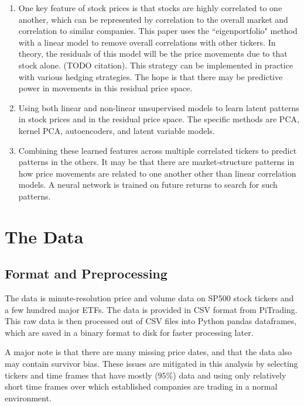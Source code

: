 \documentclass{article}
\begin{document}
\begin{enumerate}
    \item
     One key feature of stock prices is that stocks are highly correlated to one
        another, which can be represented by correlation to the overall market
        and correlation to similar companies. This paper uses the ``eigenportfolio"
        method with a linear model to remove overall correlations with other tickers.
        In theory, the residuals of this model will be the price movements due to that
        stock alone. (TODO citation). This strategy can be implemented in practice
        with various hedging strategies. The hope is that there may be predictive
        power in movements in this residual price space.
    \item
      Using both linear and non-linear unsupervised models to learn latent patterns
        in stock prices and in the residual price space. The specific methods are PCA, 
        kernel PCA, autoencoders, and latent variable models.
    \item
      Combining these learned features across multiple correlated tickers to predict
        patterns in the others. It may be that there are market-structure patterns
        in how price movements are related to one another other than linear correlation
        models. A neural network is trained on future returns to search for such patterns. 
\end{enumerate}

\section{The Data}

\subsection{Format and Preprocessing}
The data is minute-resolution price and volume data on SP500 stock tickers and 
a few hundred major ETFs.
The data is provided in CSV format from PiTrading. This raw data is then processed
out of CSV files into Python pandas dataframes, which are saved in a binary format
to disk for faster processing later. 

A major note is that there are many missing price dates, and that the data also may
contain survivor bias. These issues are mitigated in this analysis by selecting
tickers and time frames that have mostly ($95\%$) data and using only relatively
short time frames over which established companies are trading in a normal environment.
\end{document}
